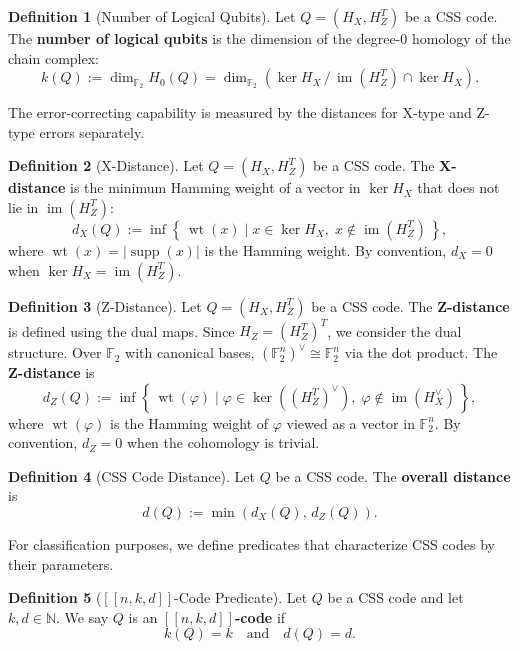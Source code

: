 \documentclass[11pt]{article}
\theoremstyle{plain}
\theoremstyle{definition}
\newtheorem*{definition}{Definition}
\theoremstyle{remark}
\renewcommand{\ker}{\operatorname{ker}}
\begin{document}
\begin{definition}[Number of Logical Qubits]
Let $Q = (H_X, H_Z^T)$ be a CSS code. The \textbf{number of logical qubits} is the dimension of the degree-$0$ homology of the chain complex:
\[
  k(Q) := \dim_{\mathbb{F}_2} H_0(Q) = \dim_{\mathbb{F}_2}\left(\ker H_X \,\big/\, \operatorname{im}(H_Z^T) \cap \ker H_X\right).
\]
\end{definition}

The error-correcting capability is measured by the distances for X-type and Z-type errors separately.

\begin{definition}[X-Distance]
Let $Q = (H_X, H_Z^T)$ be a CSS code. The \textbf{X-distance} is the minimum Hamming weight of a vector in $\ker H_X$ that does not lie in $\operatorname{im}(H_Z^T)$:
\[
  d_X(Q) := \inf\left\{\, \operatorname{wt}(x) \mid x \in \ker H_X,\; x \notin \operatorname{im}(H_Z^T) \,\right\},
\]
where $\operatorname{wt}(x) = |\operatorname{supp}(x)|$ is the Hamming weight. By convention, $d_X = 0$ when $\ker H_X = \operatorname{im}(H_Z^T)$.
\end{definition}

\begin{definition}[Z-Distance]
Let $Q = (H_X, H_Z^T)$ be a CSS code. The \textbf{Z-distance} is defined using the dual maps. Since $H_Z = (H_Z^T)^T$, we consider the dual structure. Over $\mathbb{F}_2$ with canonical bases, $(\mathbb{F}_2^n)^{\vee} \cong \mathbb{F}_2^n$ via the dot product. The \textbf{Z-distance} is
\[
  d_Z(Q) := \inf\left\{\, \operatorname{wt}(\varphi) \mid \varphi \in \ker\left((H_Z^T)^{\vee}\right),\; \varphi \notin \operatorname{im}(H_X^{\vee}) \,\right\},
\]
where $\operatorname{wt}(\varphi)$ is the Hamming weight of $\varphi$ viewed as a vector in $\mathbb{F}_2^n$. By convention, $d_Z = 0$ when the cohomology is trivial.
\end{definition}

\begin{definition}[CSS Code Distance]
Let $Q$ be a CSS code. The \textbf{overall distance} is
\[
  d(Q) := \min\left(d_X(Q),\, d_Z(Q)\right).
\]
\end{definition}

For classification purposes, we define predicates that characterize CSS codes by their parameters.

\begin{definition}[{$[\![n,k,d]\!]$-Code Predicate}]
Let $Q$ be a CSS code and let $k, d \in \mathbb{N}$. We say $Q$ is an \textbf{$[\![n,k,d]\!]$-code} if
\[
  k(Q) = k \quad \text{and} \quad d(Q) = d.
\]
\end{definition}
\end{document}

